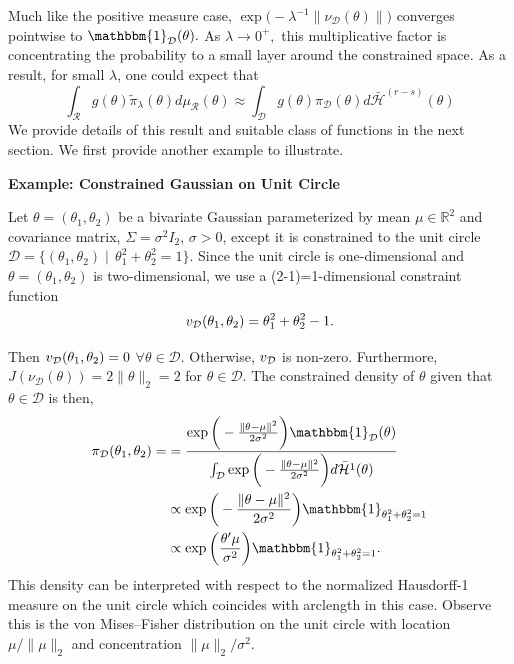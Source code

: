 \documentclass[10pt,fleqn]{article}
\DeclareMathOperator{\1}{\mathbbm{1}} \DeclareMathOperator{\bigO}{\mc O}
\begin{document}
Much like the positive measure case,
$\exp\bigg(-{\lambda^{-1}}\|\nu_\mathcal{D}(\theta)\|\bigg)$ converges
pointwise to $\mathbbm{1}_\mathcal{D}(\theta).$ As $\lambda\to0^+,$ this
multiplicative factor is concentrating the probability to a small layer
around the constrained space. As a result, for small $\lambda$, one could
expect that
$$ \int_\mathcal{R} g(\theta) \tilde{\pi}_\lambda(\theta)
d\mu_\mathcal{R}(\theta)
\approx \int_\mathcal{D} g(\theta) \pi_\mathcal{D}(\theta)
d\bar{\mathcal{H}}^{(r-s)}(\theta) $$
We provide details of this result and suitable class of functions in the
next section. We first provide another example to illustrate.

\textbf{Example: Constrained Gaussian on Unit Circle}

Let $\theta = (\theta_1,\theta_2)$ be a bivariate Gaussian parameterized by
mean $\mu \in\mathbb{R}^2$ and covariance matrix, $\Sigma = \sigma^2 I_2$,
$\sigma > 0$, except it is constrained to the unit circle $\mathcal{D} =
\{(\theta_1,\theta_2) \mid \, \theta_1^2+\theta_2^2 = 1\}.$  Since
the unit
circle is one-dimensional and $\theta = (\theta_1,\theta_2)$ is
two-dimensional, we use a (2-1)=1-dimensional constraint function $$v_{\mathcal{D}}(\theta_1,\theta_2) = \theta_1^2+\theta_2^2 -1.$$

Then $v_{\mathcal{D}}(\theta_1,\theta_2) = 0$ $\forall
\theta\in\mathcal{D}$. Otherwise, $v_{\mathcal{D}}$ is non-zero.  Furthermore,
$J(\nu_\mathcal{D}(\theta)) =
2\|\theta\|_2 = 2$ for $\theta\in\mathcal{D}.$ The constrained
density of $\theta$ given that $\theta\in \mathcal{D}$ is then,
\begin{align*} \pi_\mathcal{D}(\theta_1,\theta_2)=
& =
\frac{\exp\bigg(-\frac{\|\theta-\mu\|^2}{2\sigma^2}\bigg)\mathbbm{1}_\mathcal{D}(\theta)}{\int_\mathcal{D}
\exp\bigg(-\frac{\|\theta-\mu\|^2}{2\sigma^2}\bigg)d\bar{\mathcal{H}}^{1}(\theta)
}                                                              \\
& \propto \exp\bigg(-\frac{\|\theta-\mu\|^2}{2\sigma^2}\bigg)
\mathbbm{1}_{\theta_1^2 + \theta_2^2 = 1}                      \\ &\propto \exp\bigg(
\frac{\theta'\mu}{\sigma^2}\bigg) \mathbbm{1}_{\theta_1^2 + \theta_2^2
= 1}
.\end{align*} This density can be interpreted with respect to the normalized
Hausdorff-1 measure on the unit circle which coincides with arclength in
this case. Observe this is the von Mises--Fisher distribution on the unit
circle with location $\mu /\|\mu\|_2$ and concentration $\|\mu\|_2/\sigma^2$.
\end{document}

